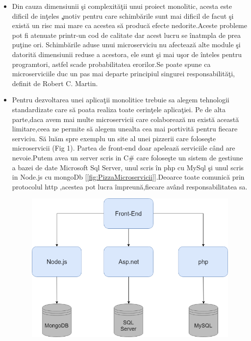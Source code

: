 \documentclass[a4paper,12pt]{report}
\let\oldref\ref
\renewcommand{\ref}[1]{[\oldref{#1}]}
\begin{document}
\begin{itemize}
	\item Din cauza dimensiunii \c si complexit\u a\c tii unui proiect monolitic,
	      acesta este dificil de in\c teles \c ,motiv pentru care schimb\u arile sunt mai dificil de facut \c si exist\u a
	      un risc mai mare ca acestea s\u a produc\u a efecte nedorite.Aceste probleme pot fi atenuate printr-un
	      cod de calitate dar acest lucru se \^ inatmpla de prea pu\c tine ori. Schimb\u arile aduse unui microserviciu nu afecteaz\u a alte
	      module \c si datorit\u a dimensiunii reduse a acestora, ele sunt \c si mai u\c sor de \^inteles pentru programtori, astfel
	      scade probabilitatea erorilor.Se poate spune ca microserviciile duc un pas mai departe principiul singurei responsabilit\u a\c ti,
	      definit de Robert C. Martin.
	\item Pentru dezvoltarea unei aplica\c tii monolitice trebuie sa alegem tehnologii standardizate care s\u a poata
	      realiza toate cerin\c tele aplica\c tiei. Pe de alta parte,daca avem mai multe microservicii care colaboreaz\u a nu exist\u a
	      aceast\u a limitare,ceea ne permite s\u a alegem unealta cea mai portivit\u a pentru fiecare serviciu.
	      S\u a lu\u am spre exemplu un site al unei pizzerii care folose\c ste microservicii (Fig 1).
	      Partea de front-end doar apeleaz\u a serviciile c\^and are nevoie.Putem avea un server scris
	      in C\# care folose\c ste un sistem de gestiune a bazei de date Microsoft Sql Server,
	      unul scris \^in php cu MySql \c si unul scris in Node.js cu mongoDb \ref{fig:PizzaMicroservicii}.Deoarce toate comunic\u a prin
	      protocolul http ,acestea pot lucra \^impreun\u a,fiecare av\^and responsabilitatea sa.
	      \begin{figure}[!htb]
		      \includegraphics[width=\textwidth,keepaspectratio]{PizzaMicroservicii}

\end{figure}
\end{itemize}
\end{document}
